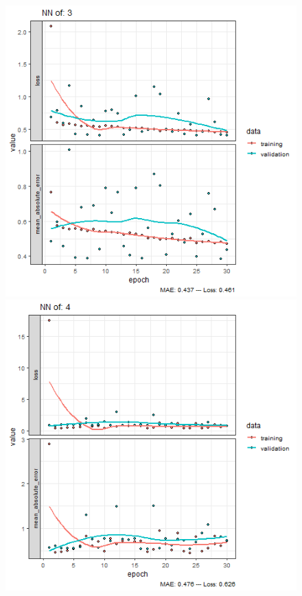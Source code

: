 \documentclass{FR16}
\begin{document}
\begin{figure}[!htb]
\begin{minipage}{0.33\textwidth}
   \end{minipage}
   \begin{minipage}{0.33\textwidth}
     \centering
     \includegraphics[width=1\linewidth]{figures/NN-3.png} 
   \end{minipage}\hfill
   \begin{minipage}{0.33\textwidth}
     \centering
     \includegraphics[width=1\linewidth]{figures/NN-4.png}

\end{minipage}
\end{figure}
\end{document}
